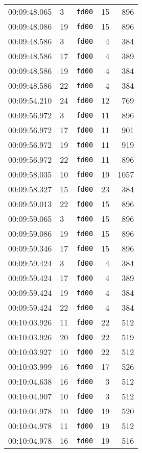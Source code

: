 \documentclass{article}
\begin{document}
\begin{longtable}{lllrr}
00:09:48.065 & 3 & \texttt{fd00} & 15 & 896 \\
00:09:48.086 & 19 & \texttt{fd00} & 15 & 896 \\
00:09:48.586 & 3 & \texttt{fd00} & 4 & 384 \\
00:09:48.586 & 17 & \texttt{fd00} & 4 & 389 \\
00:09:48.586 & 19 & \texttt{fd00} & 4 & 384 \\
00:09:48.586 & 22 & \texttt{fd00} & 4 & 384 \\
00:09:54.210 & 24 & \texttt{fd00} & 12 & 769 \\
00:09:56.972 & 3 & \texttt{fd00} & 11 & 896 \\
00:09:56.972 & 17 & \texttt{fd00} & 11 & 901 \\
00:09:56.972 & 19 & \texttt{fd00} & 11 & 919 \\
00:09:56.972 & 22 & \texttt{fd00} & 11 & 896 \\
00:09:58.035 & 10 & \texttt{fd00} & 19 & 1057 \\
00:09:58.327 & 15 & \texttt{fd00} & 23 & 384 \\
00:09:59.013 & 22 & \texttt{fd00} & 15 & 896 \\
00:09:59.065 & 3 & \texttt{fd00} & 15 & 896 \\
00:09:59.086 & 19 & \texttt{fd00} & 15 & 896 \\
00:09:59.346 & 17 & \texttt{fd00} & 15 & 896 \\
00:09:59.424 & 3 & \texttt{fd00} & 4 & 384 \\
00:09:59.424 & 17 & \texttt{fd00} & 4 & 389 \\
00:09:59.424 & 19 & \texttt{fd00} & 4 & 384 \\
00:09:59.424 & 22 & \texttt{fd00} & 4 & 384 \\
00:10:03.926 & 11 & \texttt{fd00} & 22 & 512 \\
00:10:03.926 & 20 & \texttt{fd00} & 22 & 519 \\
00:10:03.927 & 10 & \texttt{fd00} & 22 & 512 \\
00:10:03.999 & 16 & \texttt{fd00} & 17 & 526 \\
00:10:04.638 & 16 & \texttt{fd00} & 3 & 512 \\
00:10:04.907 & 10 & \texttt{fd00} & 3 & 512 \\
00:10:04.978 & 10 & \texttt{fd00} & 19 & 520 \\
00:10:04.978 & 11 & \texttt{fd00} & 19 & 512 \\
00:10:04.978 & 16 & \texttt{fd00} & 19 & 516 \\

\end{longtable}
\end{document}
